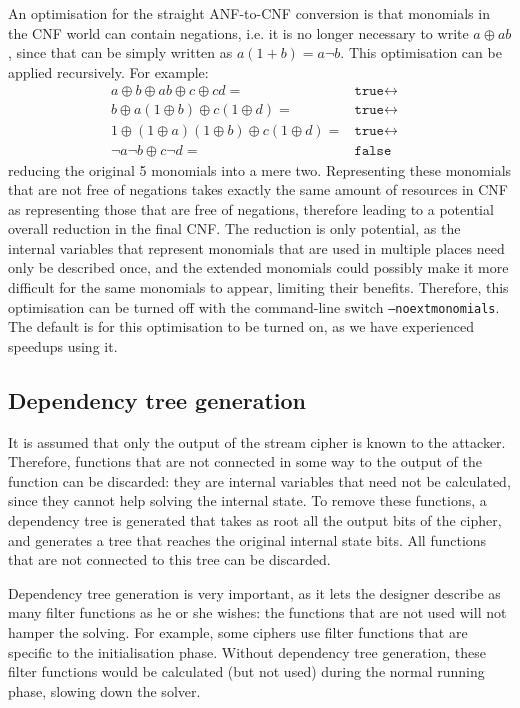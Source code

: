 \documentclass{llncs}
\begin{document}
An optimisation for the straight ANF-to-CNF conversion is that monomials in the CNF world can contain negations, i.e. it is no longer necessary to write $a \oplus ab$, since that can be simply written as $a(1+b)=a\neg b$. This optimisation can be applied recursively. For example:
\begin{align*}
a \oplus b \oplus ab \oplus c \oplus cd =& \texttt{true}
\leftrightarrow&\\
b \oplus a(1\oplus b) \oplus c(1\oplus d) =& \texttt{true}
\leftrightarrow&\\
1 \oplus (1\oplus a)(1\oplus b) \oplus c(1\oplus d) =& \texttt{true}
\leftrightarrow&\\
\neg a\neg b \oplus c\neg d =& \texttt{false}
\end{align*}
reducing the original 5 monomials into a mere two. Representing these monomials that are not free of negations takes exactly the same amount of resources in CNF as representing those that are free of negations, therefore leading to a potential overall reduction in the final CNF. The reduction is only potential, as the internal variables that represent monomials that are used in multiple places need only be described once, and the extended monomials could possibly make it more difficult for the same monomials to appear, limiting their benefits. Therefore, this optimisation can be turned off with the command-line switch \texttt{--noextmonomials}. The default is for this optimisation to be turned on, as we have experienced speedups using it.

\subsection{Dependency tree generation}
It is assumed that only the output of the stream cipher is known to the attacker. Therefore, functions that are not connected in some way to the output of the function can be discarded: they are internal variables that need not be calculated, since they cannot help solving the internal state. To remove these functions, a dependency tree is generated that takes as root all the output bits of the cipher, and generates a tree that reaches the original internal state bits. All functions that are not connected to this tree can be discarded.

Dependency tree generation is very important, as it lets the designer describe as many filter functions as he or she wishes: the functions that are not used will not hamper the solving. For example, some ciphers use filter functions that are specific to the initialisation phase. Without dependency tree generation, these filter functions would be calculated (but not used) during the normal running phase, slowing down the solver.
\end{document}
